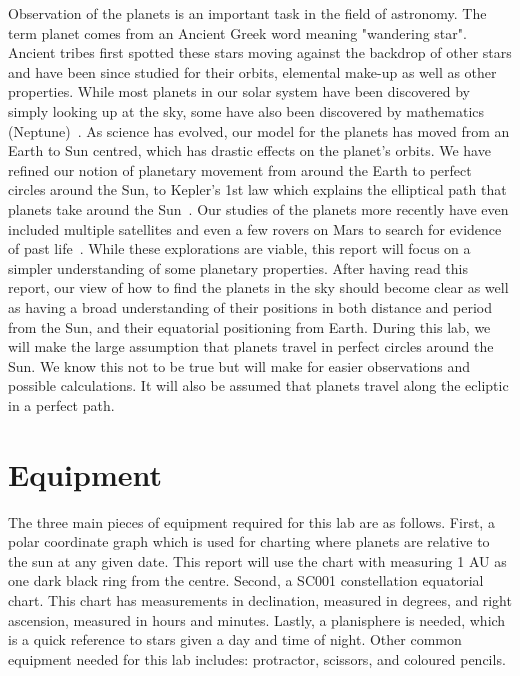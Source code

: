 \documentclass{article}
\begin{document}
Observation of the planets is an important task in the field of astronomy. The term planet comes from an Ancient Greek word
meaning "wandering star". Ancient tribes first spotted these stars moving against the backdrop of other stars and have been
since studied for their orbits, elemental make-up as well as other properties. While most planets in our solar system have been
discovered by simply looking up at the sky, some have also been discovered by mathematics (Neptune)~\cite{Edmund:2008}. 
As science has evolved, our model for the planets has moved from an Earth to Sun centred, which has drastic effects on the 
planet's orbits. We have refined our notion of planetary movement from around the Earth to perfect circles around the Sun,
to Kepler's 1st law which explains the elliptical path that planets take around the Sun~\cite{Holton:2009}. Our studies of the
planets more recently have even included multiple satellites and even a few rovers on Mars to search for evidence of past
life~\cite{NASA:2011}. While these explorations are viable, this report will focus on a simpler understanding of some planetary
properties.
After having read this report, our view of how to find the planets in the sky should become clear as well as having a broad 
understanding of their positions in both distance and period from the Sun, and their equatorial positioning from Earth.
During this lab, we will make the large assumption that planets travel in perfect circles around the Sun. We know this not
to be true but will make for easier observations and possible calculations. It will also be assumed that planets travel along
the ecliptic in a perfect path.\\


\section{Equipment}

The three main pieces of equipment required for this lab are as follows. First, a polar coordinate graph which is used for
charting where planets are relative to the sun at any given date. This report will use the chart with measuring 1 AU as 
one dark black ring from the centre. Second, a  SC001 constellation equatorial chart. This chart has measurements in declination, 
measured in degrees, and right ascension, measured in hours and minutes. Lastly, a planisphere is needed, which is a
quick reference to stars given a day and time of night. Other common equipment needed for this lab includes: protractor,
scissors, and coloured pencils.\\
\end{document}
